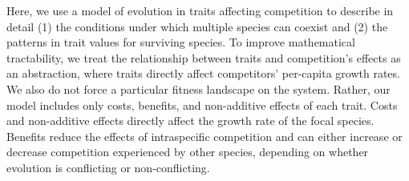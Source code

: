 Here, we use a model of evolution in traits affecting competition to describe in detail 
(1) the conditions under which multiple species can coexist and 
(2) the patterns in trait values for surviving species. 
To improve mathematical tractability, we treat the relationship between traits and competition’s 
effects as an abstraction, where traits directly affect competitors’ per-capita growth rates. 
We also do not force a particular fitness landscape on the system. Rather, our model includes 
only costs, benefits, and non-additive effects of each trait. Costs and non-additive effects 
directly affect the growth rate of the focal species. Benefits reduce the effects of intraspecific 
competition and can either increase or decrease competition experienced by other species, depending 
on whether evolution is conflicting or non-conflicting.


